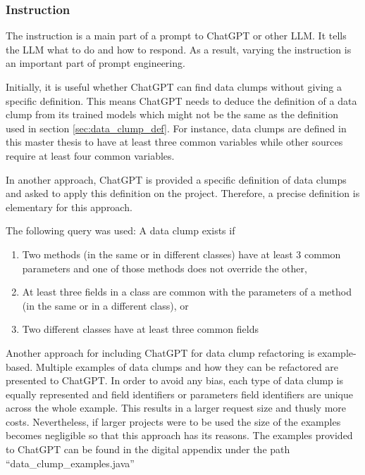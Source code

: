 \subsubsection{Instruction}\label{sec:llm_instruction}
The instruction is a main part of a prompt to ChatGPT or other \ac{LLM}. It tells the  \ac{LLM} what to do and how to respond. As a result, varying the instruction is an important part of prompt engineering. \newline



Initially, it is useful whether ChatGPT can find data clumps without giving a specific definition. This means ChatGPT needs to deduce the definition of a data clump from its trained models which might not be the same as the definition used in section \ref{sec:data_clump_def}. For instance, data clumps are defined in this master thesis to have at least three common variables while other sources require at least four common variables. 
\begin{comment}
Nevertheless, the results are fairly good. ChatGPT ignores the inheritance between \textit{MathStuff} and \textit{BetterMathStuff} and does not output a data clump for each method in \textit{MathStuff}
\end{comment}


In another approach, ChatGPT is provided a specific definition of data clumps and asked to apply this definition on the project. Therefore, a precise definition is elementary for this approach.

The following query was used:
A data clump exists if
\begin{enumerate}
\item  Two methods (in the same or in different classes) have at least 3 common parameters
    and one of those methods does not override the other, 
\item At least three fields in a class are common with the parameters of a method (in the same or in a different class), or 
\item Two different classes have at least three common fields
\end{enumerate}


Another approach for including ChatGPT for data clump refactoring is example-based. Multiple examples of data clumps and how they can be refactored are presented to ChatGPT. In order to avoid any bias, each type of data clump is equally represented and field identifiers or parameters field identifiers are unique across the whole example. This results in a larger request size and thusly more costs. Nevertheless, if larger projects were to be used the size of the examples becomes negligible so that this approach has its reasons. The examples provided to ChatGPT can be found in the digital appendix under the path \enquote{data\_clump\_examples.java} 

